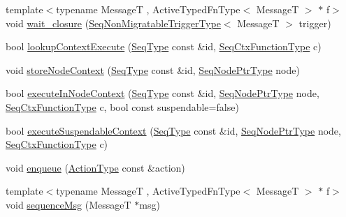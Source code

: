 \begin{DoxyCompactItemize}
\item 
{\footnotesize template$<$typename MessageT , Active\+Typed\+Fn\+Type$<$ Message\+T $>$ $\ast$ f$>$ }\\void \hyperlink{structvt_1_1seq_1_1_tagged_sequencer_ac1ba35f793dcb35a47d4e73ec6ab29d4}{wait\+\_\+closure} (\hyperlink{namespacevt_1_1seq_aa88b0d93284d188be39704024ab58b8f}{Seq\+Non\+Migratable\+Trigger\+Type}$<$ MessageT $>$ trigger)
\item 
bool \hyperlink{structvt_1_1seq_1_1_tagged_sequencer_aacd0771ce78276cd9385f5ca742fe099}{lookup\+Context\+Execute} (\hyperlink{structvt_1_1seq_1_1_tagged_sequencer_a1c8ee839258d0f88c49ef660267a81d5}{Seq\+Type} const \&id, \hyperlink{structvt_1_1seq_1_1_tagged_sequencer_ad8a1ed9b8c012cf2a73ebd2e46d6d899}{Seq\+Ctx\+Function\+Type} c)
\item 
void \hyperlink{structvt_1_1seq_1_1_tagged_sequencer_a580a0fd2ced16f447351f142f1438e42}{store\+Node\+Context} (\hyperlink{structvt_1_1seq_1_1_tagged_sequencer_a1c8ee839258d0f88c49ef660267a81d5}{Seq\+Type} const \&id, \hyperlink{namespacevt_1_1seq_ae6a4874b585be0612aaca32ca6d2d191}{Seq\+Node\+Ptr\+Type} node)
\item 
bool \hyperlink{structvt_1_1seq_1_1_tagged_sequencer_a22ec2d429c99ca4d34a6b1b0c95c658f}{execute\+In\+Node\+Context} (\hyperlink{structvt_1_1seq_1_1_tagged_sequencer_a1c8ee839258d0f88c49ef660267a81d5}{Seq\+Type} const \&id, \hyperlink{namespacevt_1_1seq_ae6a4874b585be0612aaca32ca6d2d191}{Seq\+Node\+Ptr\+Type} node, \hyperlink{structvt_1_1seq_1_1_tagged_sequencer_ad8a1ed9b8c012cf2a73ebd2e46d6d899}{Seq\+Ctx\+Function\+Type} c, bool const suspendable=false)
\item 
bool \hyperlink{structvt_1_1seq_1_1_tagged_sequencer_a7cabb68c124d242fca8c9dcb6fc51ec9}{execute\+Suspendable\+Context} (\hyperlink{structvt_1_1seq_1_1_tagged_sequencer_a1c8ee839258d0f88c49ef660267a81d5}{Seq\+Type} const \&id, \hyperlink{namespacevt_1_1seq_ae6a4874b585be0612aaca32ca6d2d191}{Seq\+Node\+Ptr\+Type} node, \hyperlink{structvt_1_1seq_1_1_tagged_sequencer_ad8a1ed9b8c012cf2a73ebd2e46d6d899}{Seq\+Ctx\+Function\+Type} c)
\item 
void \hyperlink{structvt_1_1seq_1_1_tagged_sequencer_a6c8c19a264be5d59d0abdbc31c8d6df8}{enqueue} (\hyperlink{namespacevt_ae0a5a7b18cc99d7b732cb4d44f46b0f3}{Action\+Type} const \&action)
\item 
{\footnotesize template$<$typename MessageT , Active\+Typed\+Fn\+Type$<$ Message\+T $>$ $\ast$ f$>$ }\\void \hyperlink{structvt_1_1seq_1_1_tagged_sequencer_a51470994cb625a098a7ebb9ccc489ec7}{sequence\+Msg} (MessageT $\ast$msg)
\end{DoxyCompactItemize}
